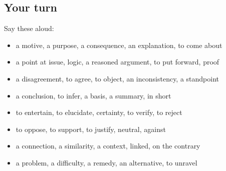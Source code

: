 \subsection*{Your turn}
Say these aloud:

\begin{itemize}
\raggedright
  \item a motive, a purpose, a consequence, an explanation, to come about
  \item a point at issue, logic, a reasoned argument, to put forward, proof
  \item a disagreement, to agree, to object, an inconsistency, a standpoint
  \item a conclusion, to infer, a basis, a summary, in short
  \item to entertain, to elucidate, certainty, to verify, to reject
  \item to oppose, to support, to justify, neutral, against
  \item a connection, a similarity, a context, linked, on the contrary
  \item a problem, a difficulty, a remedy, an alternative, to unravel
\end{itemize}

